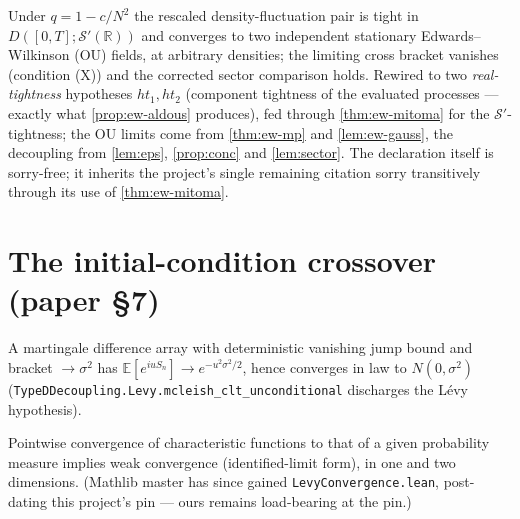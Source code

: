 \begin{theorem}\label{thm:ewmain}
  \leanok
  Under $q = 1-c/N^2$ the rescaled density-fluctuation pair is tight in
  $D([0,T];\mathcal S'(\mathbb R))$ and converges to two independent stationary
  Edwards--Wilkinson (OU) fields, at arbitrary densities; the limiting cross bracket
  vanishes (condition (X)) and the corrected sector comparison holds.  Rewired to two
  \emph{real-tightness} hypotheses $ht_1, ht_2$ (component tightness of the evaluated
  processes --- exactly what \ref{prop:ew-aldous} produces), fed through
  \ref{thm:ew-mitoma} for the $\mathcal S'$-tightness; the OU limits come from
  \ref{thm:ew-mp} and \ref{lem:ew-gauss}, the decoupling from \ref{lem:eps},
  \ref{prop:conc} and \ref{lem:sector}.  The declaration itself is sorry-free; it
  inherits the project's single remaining citation sorry transitively through its use
  of \ref{thm:ew-mitoma}.
\end{theorem}

\chapter{The initial-condition crossover (paper \S7)}

\begin{theorem}\label{thm:mcleish}
  \leanok
  A martingale difference array with deterministic vanishing jump bound and
  bracket $\to \sigma^2$ has $\mathbb E[e^{iuS_n}] \to e^{-u^2\sigma^2/2}$, hence
  converges in law to $N(0,\sigma^2)$
  (\texttt{TypeDDecoupling.Levy.mcleish\_clt\_unconditional} discharges the L\'evy
  hypothesis).
\end{theorem}

\begin{theorem}\label{thm:levy}
  \leanok
  Pointwise convergence of characteristic functions to that of a given probability
  measure implies weak convergence (identified-limit form), in one and two
  dimensions.  (Mathlib master has since gained \texttt{LevyConvergence.lean},
  post-dating this project's pin --- ours remains load-bearing at the pin.)
\end{theorem}

